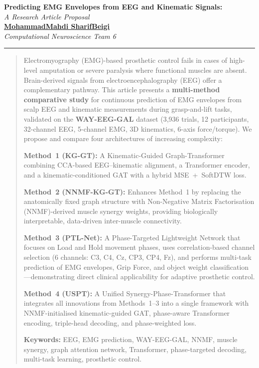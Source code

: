\documentclass[12pt, a4paper]{article}
\begin{document}
	
	\begin{center}
		{\LARGE\bfseries\color{darkblue}
			Predicting EMG Envelopes from EEG and Kinematic Signals:}\\[14pt]
		{\large\itshape\color{midblue}
			A Research Article Proposal}\\[20pt]
		{\normalsize
			\textbf{\href{mailto:sharifbeigymohammad@gmail.com}{MohammadMahdi SharifBeigi}}\\[4pt]
			\textit{Computational Neuroscience Team 6}}\\[16pt]
	\end{center}
	
	\vspace{6pt}
	\hrule height 1pt
	\vspace{14pt}
	
	\begin{abstract}
		\noindent
		Electromyography (EMG)-based prosthetic control fails in cases of
		high-level amputation or severe paralysis where functional muscles are
		absent. Brain-derived signals from electroencephalography (EEG) offer
		a complementary pathway. This article presents a \textbf{multi-method
		comparative study} for continuous prediction of EMG envelopes from
		scalp EEG and kinematic measurements during grasp-and-lift tasks,
		validated on the \textbf{WAY-EEG-GAL} dataset (3,936 trials, 12
		participants, 32-channel EEG, 5-channel EMG, 3D kinematics, 6-axis
		force/torque). We propose and compare four architectures of
		increasing complexity:
		
		\textbf{Method~1 (KG-GT):} A Kinematic-Guided Graph-Transformer
		combining CCA-based EEG--kinematic alignment, a Transformer encoder,
		and a kinematic-conditioned GAT with a hybrid MSE~+~SoftDTW loss.
		
		\textbf{Method~2 (NNMF-KG-GT):} Enhances Method~1 by replacing the
		anatomically fixed graph structure with Non-Negative Matrix
		Factorisation (NNMF)-derived muscle synergy weights, providing
		biologically interpretable, data-driven inter-muscle connectivity.
		
		\textbf{Method~3 (PTL-Net):} A Phase-Targeted Lightweight Network
		that focuses on Load and Hold movement phases, uses correlation-based
		channel selection (6 channels: C3, C4, Cz, CP3, CP4, Fz), and
		performs multi-task prediction of EMG envelopes, Grip Force, and
		object weight classification---demonstrating direct clinical
		applicability for adaptive prosthetic control.
		
		\textbf{Method~4 (USPT):} A Unified Synergy-Phase-Transformer that
		integrates all innovations from Methods~1--3 into a single framework
		with NNMF-initialised kinematic-guided GAT, phase-aware Transformer
		encoding, triple-head decoding, and phase-weighted loss.
		
		\vspace{4pt}
		\noindent\textbf{Keywords:} EEG, EMG prediction, WAY-EEG-GAL,
		NNMF, muscle synergy, graph attention network, Transformer,
		phase-targeted decoding, multi-task learning, prosthetic control.
	\end{abstract}
	
\end{document}
